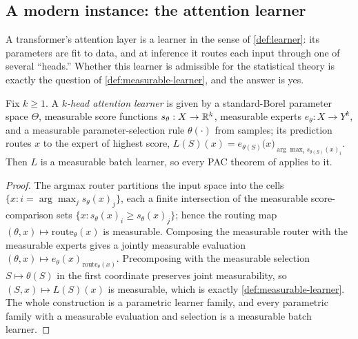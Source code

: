 \subsection{A modern instance: the attention learner}
\label{sec:attention-learner}

A transformer's attention layer is a learner in the sense of \cref{def:learner}: its parameters are fit to data, and at inference it routes each input through one of several ``heads.'' Whether this learner is admissible for the statistical theory is exactly the question of \cref{def:measurable-learner}, and the answer is yes.

\begin{prop}
\label{prop:attention-mbl}
Fix $k \geq 1$. A \emph{$k$-head attention learner} is given by a standard-Borel parameter space $\Theta$, measurable score functions $s_\theta : X \to \mathbb{R}^k$, measurable experts $e_\theta : X \to Y^k$, and a measurable parameter-selection rule $\theta(\cdot)$ from samples; its prediction routes $x$ to the expert of highest score, $L(S)(x) = e_{\theta(S)}\bigl(x\bigr)_{\arg\max_i s_{\theta(S)}(x)_i}$. Then $L$ is a measurable batch learner, so every PAC theorem of  applies to it.
\end{prop}

\begin{proof}
The argmax router partitions the input space into the cells $\{x : i = \arg\max_j s_\theta(x)_j\}$, each a finite intersection of the measurable score-comparison sets $\{x : s_\theta(x)_i \geq s_\theta(x)_j\}$; hence the routing map $(\theta, x) \mapsto \mathrm{route}_\theta(x)$ is measurable. Composing the measurable router with the measurable experts gives a jointly measurable evaluation $(\theta, x) \mapsto e_\theta(x)_{\mathrm{route}_\theta(x)}$. Precomposing with the measurable selection $S \mapsto \theta(S)$ in the first coordinate preserves joint measurability, so $(S,x) \mapsto L(S)(x)$ is measurable, which is exactly \cref{def:measurable-learner}. The whole construction is a parametric learner family, and every parametric family with a measurable evaluation and selection is a measurable batch learner.
\end{proof}

